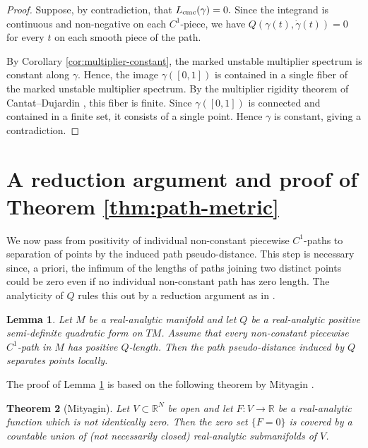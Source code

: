 \documentclass[11pt]{amsart}
\theoremstyle{plain}
\newtheorem{thm}{Theorem}[section]
\newtheorem{lem}[thm]{Lemma}
\theoremstyle{definition}
\theoremstyle{remark}
\begin{document}
\begin{proof}
Suppose, by contradiction, that
$L_{\rm cmc}(\gamma)=0.
$
Since the integrand is continuous and non-negative on each $C^1$-piece, we
have
$Q(\gamma(t),\dot\gamma(t))=0$
for every $t$ on each smooth piece of the path. 


By Corollary \ref{cor:multiplier-constant}, the
marked unstable multiplier spectrum is constant along $\gamma$. Hence,
 the image $\gamma([0,1])$ is contained in a single fiber of the marked
unstable multiplier spectrum.
By the
multiplier rigidity theorem of Cantat--Dujardin \cite{CD26Henon}, this fiber is
finite. 
Since $\gamma([0,1])$ is connected
and contained in a finite set, it consists of a single point. Hence $\gamma$
is constant, giving a contradiction.
\end{proof}


\section{A reduction argument and proof of Theorem \ref{thm:path-metric}}\label{s:reduction-proof}

We now pass from positivity of individual non-constant
piecewise $C^1$-paths to separation of points by the induced path pseudo-distance. This step is necessary since, a priori, the infimum of the lengths of paths joining two distinct points could be zero even if no individual non-constant path has zero length. The analyticity of $Q$ rules this out by a reduction argument as in \cite[Section 5.4]{BH24}.


\begin{lem}\label{lem:semi-reduction}
Let $M$ be a real-analytic manifold and let $Q$ be a real-analytic
positive semi-definite quadratic form on $TM$. Assume that every non-constant
piecewise $C^1$-path in $M$ has positive $Q$-length. Then the path
pseudo-distance induced by $Q$ separates points locally.
\end{lem}

The proof of Lemma \ref{lem:semi-reduction}
is based on the
following theorem by Mityagin \cite{Mit15}.

\begin{thm}[Mityagin]\label{t:mityagin}
Let $V\subset\mathbb R^N$ be open and let
$F\colon V\to\mathbb R$
be a real-analytic function which is not identically zero. Then the zero set
$\{F=0\}$
is covered by a countable union of 
(not necessarily closed) real-analytic submanifolds of $V$.
\end{thm}
\end{document}

